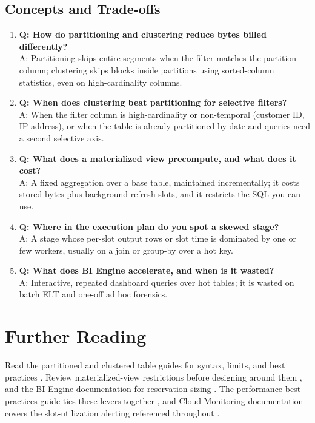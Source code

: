 \subsection{Concepts and Trade-offs}
\begin{enumerate}
    \item \textbf{Q: How do partitioning and clustering reduce bytes billed differently?}\\
    A: Partitioning skips entire segments when the filter matches the partition column; clustering skips blocks inside partitions using sorted-column statistics, even on high-cardinality columns.

    \item \textbf{Q: When does clustering beat partitioning for selective filters?}\\
    A: When the filter column is high-cardinality or non-temporal (customer ID, IP address), or when the table is already partitioned by date and queries need a second selective axis.

    \item \textbf{Q: What does a materialized view precompute, and what does it cost?}\\
    A: A fixed aggregation over a base table, maintained incrementally; it costs stored bytes plus background refresh slots, and it restricts the SQL you can use.

    \item \textbf{Q: Where in the execution plan do you spot a skewed stage?}\\
    A: A stage whose per-slot output rows or slot time is dominated by one or few workers, usually on a join or group-by over a hot key.

    \item \textbf{Q: What does BI Engine accelerate, and when is it wasted?}\\
    A: Interactive, repeated dashboard queries over hot tables; it is wasted on batch ELT and one-off ad hoc forensics.
\end{enumerate}

\section{Further Reading}
Read the partitioned and clustered table guides for syntax, limits, and best practices \cite{googlecloudbigquerypartitioning,googlecloudbigqueryclustering}. Review materialized-view restrictions before designing around them \cite{googlecloudbigquerymv}, and the BI Engine documentation for reservation sizing \cite{googlecloudbiengine}. The performance best-practices guide ties these levers together \cite{googlecloudbigquerydocs}, and Cloud Monitoring documentation covers the slot-utilization alerting referenced throughout \cite{googlecloudmonitoringdocs}.

